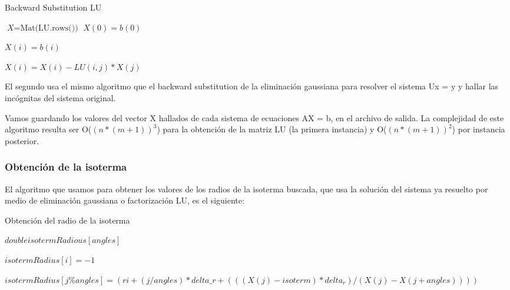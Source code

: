 \begin{algorithm}
\caption{Backward Substitution LU}\label{euclid}
\begin{algorithmic}[1]


    \State $\textit{X} = \text{Mat(LU.rows())}$
    \State $X(0) = b(0)$

      \State $X(i) = b(i)$

        \State $X(i) = X(i) - LU(i,j)*X(j)$
      \EndFor

    \EndFor
      
  \EndFunction

\end{algorithmic}
\end{algorithm}

El segundo usa el mismo algoritmo que el backward substitution de la eliminación gaussiana para resolver el sistema Ux = y y hallar las incógnitas del sistema original. 

Vamos guardando los valores del vector X hallados de cada sistema de ecuaciones AX = b, en el archivo de salida. La complejidad de este algoritmo resulta ser O($(n*(m+1))^{3}$) para la obtención de la matriz LU (la primera instancia) y O($(n*(m+1))^{2}$)
por instancia posterior.


\subsubsection{Obtención de la isoterma}

El algoritmo que usamos para obtener los valores de los radios de la isoterma buscada, que usa la solución del sistema ya resuelto por medio de eliminación gaussiana o factorización LU, es el siguiente:

\begin{algorithm}
\caption{Obtención del radio de la isoterma}\label{euclid}
\begin{algorithmic}[1]



    \State $double isotermRadious[angles]$

      \State $isotermRadius[i] = -1$
    \EndFor

       \State $isotermRadius[j \% angles] = (ri + (j / angles)*delta\_r + (((X(j) - isoterm) * delta_r)/ (X(j) - X(j+angles)) ))$
      \EndIf
    \EndFor

  \EndFunction

\end{algorithmic}
\end{algorithm}

